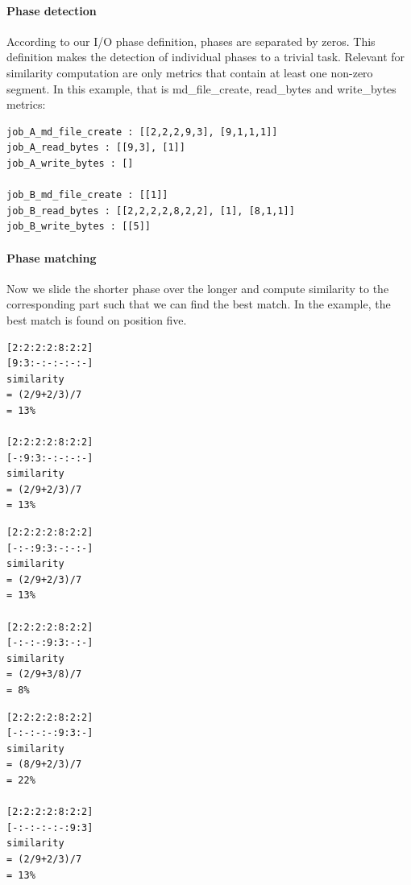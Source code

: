 \documentclass[]{llncs}
\begin{document}
\paragraph{Phase detection}
According to our I/O phase definition, phases are separated by zeros.
This definition makes the detection of individual phases to a trivial task.
Relevant for similarity computation are only metrics that contain at least one non-zero segment.
In this example, that is md\_file\_create, read\_bytes and write\_bytes metrics:
\begin{lstlisting}
job_A_md_file_create : [[2,2,2,9,3], [9,1,1,1]]
job_A_read_bytes : [[9,3], [1]]
job_A_write_bytes : []

job_B_md_file_create : [[1]]
job_B_read_bytes : [[2,2,2,2,8,2,2], [1], [8,1,1]]
job_B_write_bytes : [[5]]
\end{lstlisting}

\paragraph{Phase matching}
Now we slide the shorter phase over the longer and compute similarity to the corresponding part such that we can find the best match.
In the example, the best match is found on position five.

\noindent\begin{minipage}{0.33\textwidth}
\begin{lstlisting}
[2:2:2:2:8:2:2]
[9:3:-:-:-:-:-]
similarity
= (2/9+2/3)/7
= 13%

[2:2:2:2:8:2:2]
[-:9:3:-:-:-:-]
similarity
= (2/9+2/3)/7
= 13%
\end{lstlisting}
\end{minipage}
%
\noindent\begin{minipage}{0.33\textwidth}
\begin{lstlisting}
[2:2:2:2:8:2:2]
[-:-:9:3:-:-:-]
similarity
= (2/9+2/3)/7
= 13%

[2:2:2:2:8:2:2]
[-:-:-:9:3:-:-]
similarity
= (2/9+3/8)/7
= 8%
\end{lstlisting}
\end{minipage}
%
\noindent\begin{minipage}{0.33\textwidth}
\begin{lstlisting}
[2:2:2:2:8:2:2]
[-:-:-:-:9:3:-]
similarity
= (8/9+2/3)/7
= 22%

[2:2:2:2:8:2:2]
[-:-:-:-:-:9:3]
similarity
= (2/9+2/3)/7
= 13%
\end{lstlisting}
\end{minipage}
\end{document}
